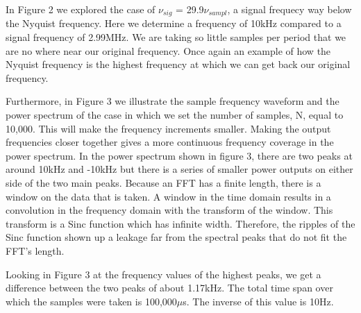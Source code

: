 \documentclass[12pt]{article}
\begin{document}
In Figure 2 we explored the case of $\nu_{sig}$ = 29.9$\nu_{sampl}$, a
signal frequecy way below the Nyquist frequency. Here we determine a
frequency of 10kHz compared to a signal frequency of 2.99MHz. We are
taking so little samples per period that we are no where near our
original frequency. Once again an example of how the Nyquist frequency
is the highest frequency at which we can get back our original
frequency.

Furthermore, in Figure 3 we illustrate the sample frequency waveform and
the power spectrum of the case in which we set the number of samples, N,
equal to 10,000. This will make the frequency increments smaller. Making
the output frequencies closer together
gives a more continuous frequency coverage in the power spectrum. In the
power spectrum shown in figure 3, there are two peaks at around 10kHz
and -10kHz but there is a series of smaller power outputs on either side
of the two main peaks. Because an FFT has a finite length, there is a
window on the data that is taken. A window in the time domain results in
a convolution in the frequency domain with the transform of the
window. This transform is a Sinc function which has infinite
width. Therefore, the ripples of the Sinc function shown up a leakage
far from the spectral peaks that do not fit the FFT's length. 

Looking in Figure 3 at the frequency values of the highest peaks, we get
a difference between the two peaks of about 1.17kHz. The total time span
over which the samples were taken is 100,000$\mu$s. The inverse of this
value is 10Hz.
\end{document}
